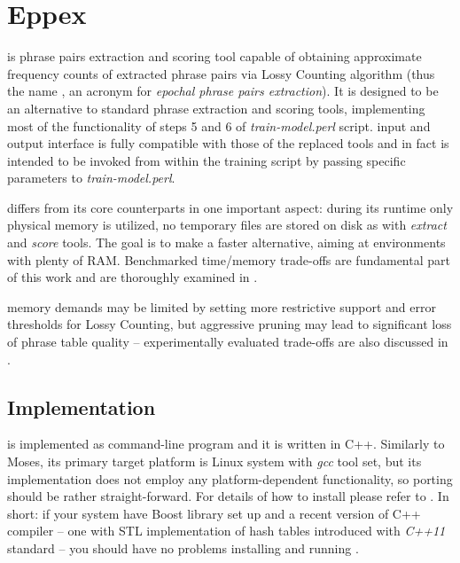 
\chapter{Eppex}
\label{chap:eppex}

\Eppex{} is phrase pairs extraction and scoring tool capable of obtaining
approximate frequency counts of extracted phrase pairs via Lossy Counting algorithm
(thus the name \eppex{}, an acronym for \emph{epochal phrase pairs extraction}).
It is designed to be an alternative to standard phrase extraction and scoring tools,
implementing most of the functionality of steps 5 and 6 of \emph{train-model.perl} script.
\Eppex{} input and output interface is fully compatible with those of the replaced tools
and \eppex{} in fact is intended to be invoked from within the training script
by passing specific parameters to \emph{train-model.perl}.

\Eppex{} differs from its core counterparts in one important aspect: during its
runtime only physical memory is utilized, no temporary files are stored on disk
as with \emph{extract} and \emph{score} tools.
The goal is to make \eppex{} a faster alternative, aiming at environments with plenty of RAM.
Benchmarked time/memory trade-offs are fundamental part of this work and
are thoroughly examined in .

\Eppex{} memory demands may be limited by setting more restrictive support and error thresholds
for Lossy Counting, but aggressive pruning may lead to significant loss of phrase table quality
-- experimentally evaluated trade-offs are also discussed in .

\section{Implementation}

\Eppex{} is implemented as command-line program and it is written in C++.
Similarly to Moses, its primary target platform is Linux system with \emph{gcc} tool set,
but its implementation does not employ any platform-dependent functionality,
so porting should be rather straight-forward.
For details of how to install \eppex{} please refer to .
In short: if your system have Boost library set up and a recent version of C++ compiler
-- one with STL implementation of hash tables introduced with \emph{C++11} standard --
you should have no problems installing and running \eppex{}.


